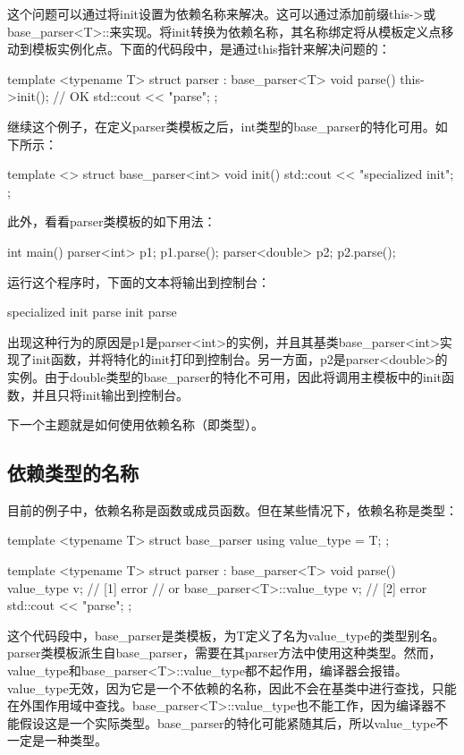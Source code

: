 这个问题可以通过将init设置为依赖名称来解决。这可以通过添加前缀this->或base\_parser<T>::来实现。将init转换为依赖名称，其名称绑定将从模板定义点移动到模板实例化点。下面的代码段中，是通过this指针来解决问题的：

\begin{cpp}
template <typename T>
struct parser : base_parser<T>
{
	void parse()
	{
		this->init(); // OK
		std::cout << "parse\n";
	}
};
\end{cpp}

继续这个例子，在定义parser类模板之后，int类型的base\_parser的特化可用。如下所示：

\begin{cpp}
template <>
struct base_parser<int>
{
	void init()
	{
		std::cout << "specialized init\n";
	}
};
\end{cpp}

此外，看看parser类模板的如下用法：

\begin{cpp}
int main()
{
	parser<int> p1;
	p1.parse();
	parser<double> p2;
	p2.parse();
}
\end{cpp}

运行这个程序时，下面的文本将输出到控制台：

\begin{cpp}
specialized init
parse
init
parse
\end{cpp}

出现这种行为的原因是p1是parser<int>的实例，并且其基类base\_parser<int>实现了init函数，并将特化的init打印到控制台。另一方面，p2是parser<double>的实例。由于double类型的base\_parser的特化不可用，因此将调用主模板中的init函数，并且只将init输出到控制台。

下一个主题就是如何使用依赖名称（即类型）。

\subsection{依赖类型的名称}

目前的例子中，依赖名称是函数或成员函数。但在某些情况下，依赖名称是类型：

\begin{cpp}
template <typename T>
struct base_parser
{
	using value_type = T;
};

template <typename T>
struct parser : base_parser<T>
{
	void parse()
	{
		value_type v{}; // [1] error
		// or
		base_parser<T>::value_type v{}; // [2] error
		std::cout << "parse\n";
	}
};
\end{cpp}

这个代码段中，base\_parser是类模板，为T定义了名为value\_type的类型别名。parser类模板派生自base\_parser，需要在其parser方法中使用这种类型。然而，value\_type和base\_parser<T>::value\_type都不起作用，编译器会报错。value\_type无效，因为它是一个不依赖的名称，因此不会在基类中进行查找，只能在外围作用域中查找。base\_parser<T>::value\_type也不能工作，因为编译器不能假设这是一个实际类型。base\_parser的特化可能紧随其后，所以value\_type不一定是一种类型。

